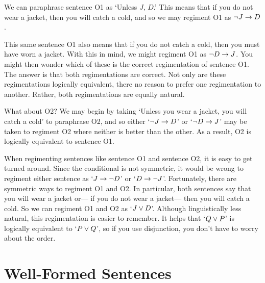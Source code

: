 We can paraphrase sentence O1 as `Unless $J$, $D$.'
This means that if you do not wear a jacket, then you will catch a cold, and so we may regiment O1 as $\neg J \rightarrow D$.

This same sentence O1 also means that if you do not catch a cold, then you must have worn a jacket.
With this in mind, we might regiment O1 as $\neg D \rightarrow J$.
You might then wonder which of these is the correct regimentation of sentence O1.
The answer is that both regimentations are correct.
Not only are these regimentations logically equivalent, there no reason to prefer one regimentation to another.
Rather, both regimentations are equally natural.

What about O2?
We may begin by taking `Unless you wear a jacket, you will catch a cold' to paraphrase O2, and so either `$\neg J \rightarrow D$' or `$\neg D \rightarrow J$' may be taken to regiment O2 where neither is better than the other.
As a result, O2 is logically equivalent to sentence O1.

When regimenting sentences like sentence O1 and sentence O2, it is easy to get turned around.
Since the conditional is not symmetric, it would be wrong to regiment either sentence as `$J \rightarrow \neg D$' or `$D \rightarrow \neg J$'.
Fortunately, there are symmetric ways to regiment O1 and O2.
In particular, both sentences say that you will wear a jacket or--- if you do not wear a jacket--- then you will catch a cold.
So we can regiment O1 and O2 as `$J \vee D$'.
Although linguistically less natural, this regimentation is easier to remember.
It helps that  `$Q \vee P$' is logically equivalent to `$P \vee Q$', so if you use disjunction, you don't have to worry about the order.
%
%
%





\section{Well-Formed Sentences}
  \label{sec:PLsentences}

